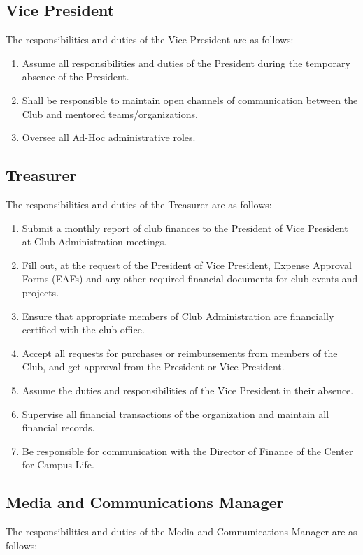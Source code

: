 \documentclass[english,11pt]{article}
\begin{document}
\subsection{Vice President} \label{sect:cadmin:vicepresident}
The responsibilities and duties of the Vice President are as follows:

\begin{enumerate}[label=\Alph*.]	
    \item Assume all responsibilities and duties of the President during the temporary absence of the President.
    \item Shall be responsible to maintain open channels of communication between the Club and mentored teams/organizations.
    \item Oversee all Ad-Hoc administrative roles.
\end{enumerate}

\subsection{Treasurer} \label{sect:cadmin:treasurer}
The responsibilities and duties of the Treasurer are as follows:

\begin{enumerate}[label=\Alph*.]
    \item Submit a monthly report of club finances to the President of Vice President at Club Administration meetings.
    \item Fill out, at the request of the President of Vice President, Expense Approval Forms (EAFs) and any other required financial documents for club events and projects.
    \item Ensure that appropriate members of Club Administration are financially certified with the club office.
    \item Accept all requests for purchases or reimbursements from members of the Club, and get approval from the President or Vice President.
    \item Assume the duties and responsibilities of the Vice President in their absence.
    \item Supervise all financial transactions of the organization and maintain all financial records.
    \item Be responsible for communication with the Director of Finance of the Center for Campus Life.
\end{enumerate}

\subsection{Media and Communications Manager} \label{sect:cadmin:mediacomms}
The responsibilities and duties of the Media and Communications Manager are as follows:
\end{document}
